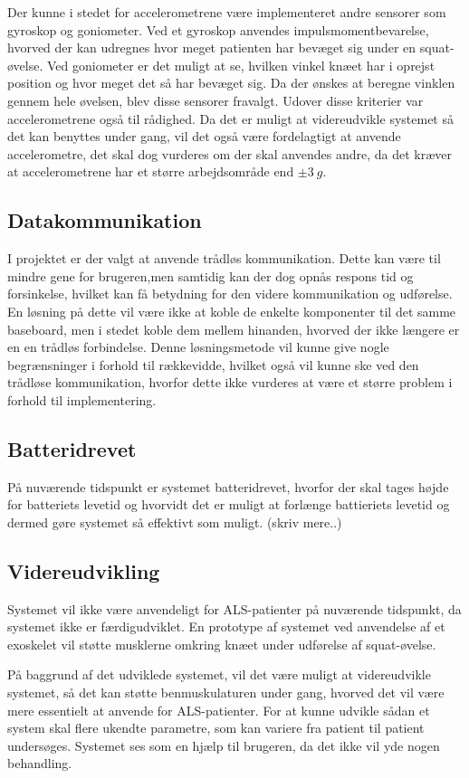 Der kunne i stedet for accelerometrene være implementeret andre sensorer som gyroskop og goniometer. Ved et gyroskop anvendes impulsmomentbevarelse, hvorved der kan udregnes hvor meget patienten har bevæget sig under en squat-øvelse. Ved goniometer er det muligt at se, hvilken vinkel knæet har i oprejst position og hvor meget det så har bevæget sig. Da der ønskes at beregne vinklen gennem hele øvelsen, blev disse sensorer fravalgt. Udover disse kriterier  var accelerometrene også til rådighed. Da det er muligt at videreudvikle systemet så det kan benyttes under gang, vil det også være fordelagtigt at anvende accelerometre, det skal dog vurderes om der skal anvendes andre, da det kræver at accelerometrene har et større arbejdsområde end $\pm3~g$.

\subsection{Datakommunikation}
I projektet er der valgt at anvende trådløs kommunikation. Dette kan være til mindre gene for brugeren,men samtidig kan der dog opnås respons tid og forsinkelse, hvilket kan få betydning for den videre kommunikation og udførelse. En løsning på dette vil være ikke at koble de enkelte komponenter til det samme baseboard, men i stedet koble dem mellem hinanden, hvorved der ikke længere er en en trådløs forbindelse. Denne løsningsmetode vil kunne give nogle begrænsninger i forhold til rækkevidde, hvilket også vil kunne ske ved den trådløse kommunikation, hvorfor dette ikke vurderes at være et større problem i forhold til implementering. 


\subsection{Batteridrevet}
På nuværende tidspunkt er systemet batteridrevet, hvorfor der skal tages højde for batteriets levetid og hvorvidt det er muligt at forlænge battieriets levetid og dermed gøre systemet så effektivt som muligt. (skriv mere..)

\subsection{Videreudvikling}
Systemet vil ikke være anvendeligt for ALS-patienter på nuværende tidspunkt, da systemet ikke er færdigudviklet. En prototype af systemet ved anvendelse af et exoskelet vil støtte musklerne omkring knæet under udførelse af squat-øvelse. 

På baggrund af det udviklede systemet, vil det være muligt at videreudvikle systemet, så det kan støtte benmuskulaturen under gang, hvorved det vil være mere essentielt at anvende for ALS-patienter. For at kunne udvikle sådan et system skal flere ukendte parametre, som kan variere fra patient til patient undersøges. Systemet ses som en hjælp til brugeren, da det ikke vil yde nogen behandling. 

